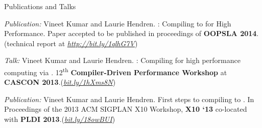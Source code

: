 \documentclass{resume} %
\begin{document}


\begin{rSection}{Publications and Talks}
\smallskip
\begin{lSubsection}


\item \emph{Publication:} Vineet Kumar and Laurie Hendren. \mixten:
  Compiling \matlab to \xten for High Performance. Paper accepted to be
  published in proceedings of \textbf{OOPSLA 2014}.(technical report at
  \href{http://bit.ly/1qlhG7V}{\em{http://bit.ly/1qlhG7V}})

\item \emph{Talk:} Vineet Kumar and Laurie Hendren. \mixten: Compiling \matlab
  for high performance computing via \xten. 12\textsuperscript{th}
  \textbf{Compiler-Driven Performance Workshop} at \textbf{CASCON
  2013}.(\href{http://webdocs.cs.ualberta.ca/~amaral/cascon/CDP13/#VinetKumar}{\em{bit.ly/1hXms8N}}) 

\item \emph{Publication:} Vineet Kumar and Laurie Hendren. First steps to
compiling \matlab to \xten. In Proceedings of the 2013 ACM SIGPLAN X10
Workshop, \textbf{X10 `13} co-located with \textbf{PLDI
2013}.(\href{http://www.sable.mcgill.ca/mclab/mix10/paper.pdf}{\em{bit.ly/18owBUI}})
\end{lSubsection}
\end{rSection}

 
\end{document}
